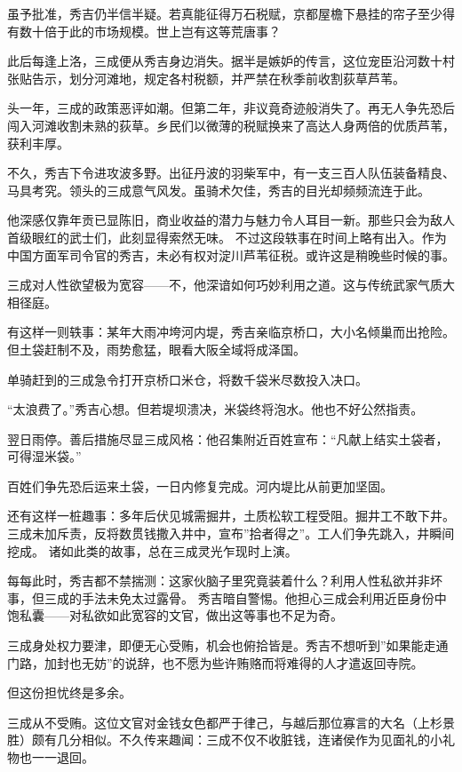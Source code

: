 \documentclass[
]{article}
\begin{document}
虽予批准，秀吉仍半信半疑。若真能征得万石税赋，京都屋檐下悬挂的帘子至少得有数十倍于此的市场规模。世上岂有这等荒唐事？

此后每逢上洛，三成便从秀吉身边消失。据半是嫉妒的传言，这位宠臣沿河数十村张贴告示，划分河滩地，规定各村税额，并严禁在秋季前收割荻草芦苇。

头一年，三成的政策恶评如潮。但第二年，非议竟奇迹般消失了。再无人争先恐后闯入河滩收割未熟的荻草。乡民们以微薄的税赋换来了高达人身两倍的优质芦苇，获利丰厚。

不久，秀吉下令进攻波多野。出征丹波的羽柴军中，有一支三百人队伍装备精良、马具考究。领头的三成意气风发。虽骑术欠佳，秀吉的目光却频频流连于此。

他深感仅靠年贡已显陈旧，商业收益的潜力与魅力令人耳目一新。那些只会为敌人首级眼红的武士们，此刻显得索然无味。
不过这段轶事在时间上略有出入。作为中国方面军司令官的秀吉，未必有权对淀川芦苇征税。或许这是稍晚些时候的事。

三成对人性欲望极为宽容------不，他深谙如何巧妙利用之道。这与传统武家气质大相径庭。

有这样一则轶事：某年大雨冲垮河内堤，秀吉亲临京桥口，大小名倾巢而出抢险。但土袋赶制不及，雨势愈猛，眼看大阪全域将成泽国。

单骑赶到的三成急令打开京桥口米仓，将数千袋米尽数投入决口。

``太浪费了。''秀吉心想。但若堤坝溃决，米袋终将泡水。他也不好公然指责。

翌日雨停。善后措施尽显三成风格：他召集附近百姓宣布：``凡献上结实土袋者，可得湿米袋。''

百姓们争先恐后运来土袋，一日内修复完成。河内堤比从前更加坚固。

还有这样一桩趣事：多年后伏见城需掘井，土质松软工程受阻。掘井工不敢下井。三成未加斥责，反将数贯钱撒入井中，宣布''拾者得之''。工人们争先跳入，井瞬间挖成。
诸如此类的故事，总在三成灵光乍现时上演。

每每此时，秀吉都不禁揣测：这家伙脑子里究竟装着什么？利用人性私欲并非坏事，但三成的手法未免太过露骨。
秀吉暗自警惕。他担心三成会利用近臣身份中饱私囊------对私欲如此宽容的文官，做出这等事也不足为奇。

三成身处权力要津，即便无心受贿，机会也俯拾皆是。秀吉不想听到''如果能走通门路，加封也无妨''的说辞，也不愿为些许贿赂而将难得的人才遣返回寺院。

但这份担忧终是多余。

三成从不受贿。这位文官对金钱女色都严于律己，与越后那位寡言的大名（上杉景胜）颇有几分相似。不久传来趣闻：三成不仅不收脏钱，连诸侯作为见面礼的小礼物也一一退回。
\end{document}

